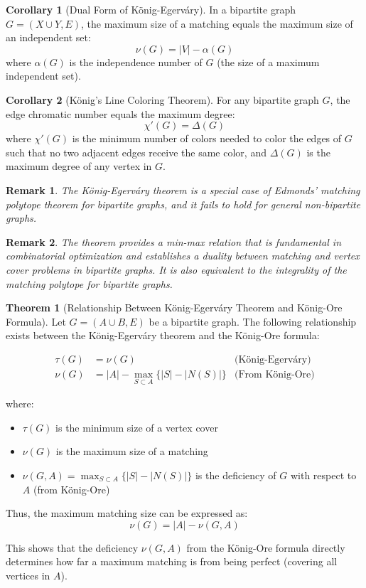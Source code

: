 \documentclass{article}
\newtheorem{remark}{Remark}
\theoremstyle{definition}
\newtheorem{theorem}{Theorem}
\newtheorem{corollary}{Corollary}
\begin{document}
\begin{corollary}[Dual Form of König-Egerváry]
In a bipartite graph $G = (X \cup Y, E)$, the maximum size of a matching equals the maximum size of an independent set:
\[
\nu(G) = |V| - \alpha(G)
\]
where $\alpha(G)$ is the independence number of $G$ (the size of a maximum independent set).
\end{corollary}

\begin{corollary}[König's Line Coloring Theorem]
For any bipartite graph $G$, the edge chromatic number equals the maximum degree:
\[
\chi'(G) = \Delta(G)
\]
where $\chi'(G)$ is the minimum number of colors needed to color the edges of $G$ such that no two adjacent edges receive the same color, and $\Delta(G)$ is the maximum degree of any vertex in $G$.
\end{corollary}

\begin{remark}
The König-Egerváry theorem is a special case of Edmonds' matching polytope theorem for bipartite graphs, and it fails to hold for general non-bipartite graphs.
\end{remark}

\begin{remark}
The theorem provides a min-max relation that is fundamental in combinatorial optimization and establishes a duality between matching and vertex cover problems in bipartite graphs. It is also equivalent to the integrality of the matching polytope for bipartite graphs.
\end{remark}

\begin{theorem}[Relationship Between König-Egerváry Theorem and König-Ore Formula]
Let $G = (A \cup B, E)$ be a bipartite graph. The following relationship exists between the König-Egerváry theorem and the König-Ore formula:

\begin{align}
\tau(G) &= \nu(G) & \text{(König-Egerváry)} \\
\nu(G) &= |A| - \max_{S \subset A} \{|S| - |N(S)|\} & \text{(From König-Ore)}
\end{align}

where:
\begin{itemize}
    \item $\tau(G)$ is the minimum size of a vertex cover
    \item $\nu(G)$ is the maximum size of a matching
    \item $\nu(G, A) = \max_{S \subset A} \{|S| - |N(S)|\}$ is the deficiency of $G$ with respect to $A$ (from König-Ore)
\end{itemize}

Thus, the maximum matching size can be expressed as:
\[
\nu(G) = |A| - \nu(G, A)
\]

This shows that the deficiency $\nu(G, A)$ from the König-Ore formula directly determines how far a maximum matching is from being perfect (covering all vertices in $A$).
\end{theorem}
\end{document}
